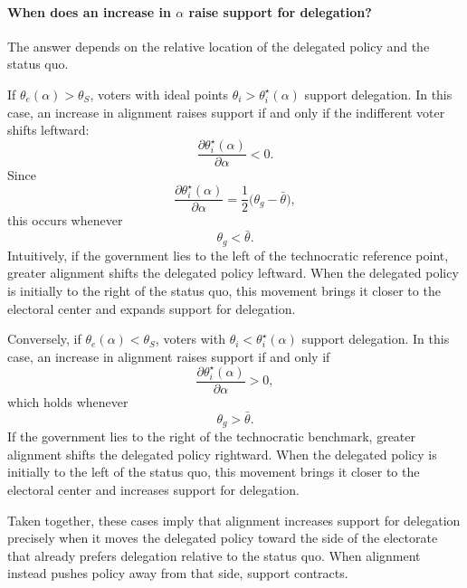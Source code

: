 \documentclass[11pt]{article}\usepackage[]{graphicx}\usepackage[]{xcolor}
\begin{document}
\paragraph{When does an increase in $\alpha$ raise support for delegation?}

The answer depends on the relative location of the delegated policy and the status quo.

If $\theta_e(\alpha) > \theta_S$, voters with ideal points $\theta_i > \theta_i^\star(\alpha)$ support delegation. In this case, an increase in alignment raises support if and only if the indifferent voter shifts leftward:
\[
\frac{\partial \theta_i^\star(\alpha)}{\partial \alpha} < 0.
\]
Since
\[
\frac{\partial \theta_i^\star(\alpha)}{\partial \alpha}
=
\frac{1}{2}\big(\theta_g - \bar{\theta}\big),
\]
this occurs whenever
\[
\theta_g < \bar{\theta}.
\]
Intuitively, if the government lies to the left of the technocratic reference point, greater alignment shifts the delegated policy leftward. When the delegated policy is initially to the right of the status quo, this movement brings it closer to the electoral center and expands support for delegation.

Conversely, if $\theta_e(\alpha) < \theta_S$, voters with $\theta_i < \theta_i^\star(\alpha)$ support delegation. In this case, an increase in alignment raises support if and only if
\[
\frac{\partial \theta_i^\star(\alpha)}{\partial \alpha} > 0,
\]
which holds whenever
\[
\theta_g > \bar{\theta}.
\]
If the government lies to the right of the technocratic benchmark, greater alignment shifts the delegated policy rightward. When the delegated policy is initially to the left of the status quo, this movement brings it closer to the electoral center and increases support for delegation.

Taken together, these cases imply that alignment increases support for delegation precisely when it moves the delegated policy toward the side of the electorate that already prefers delegation relative to the status quo. When alignment instead pushes policy away from that side, support contracts.
\end{document}
